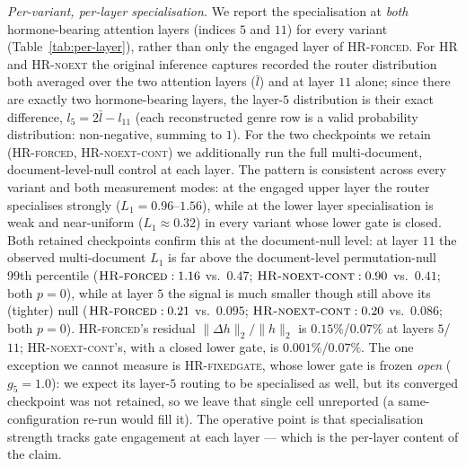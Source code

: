 \emph{Per-variant, per-layer specialisation.} We report the specialisation at \emph{both} hormone-bearing attention layers (indices $5$ and $11$) for every variant (Table~\ref{tab:per-layer}), rather than only the engaged layer of \textsc{HR-forced}. For \textsc{HR} and \textsc{HR-noext} the original inference captures recorded the router distribution both averaged over the two attention layers ($\bar l$) and at layer $11$ alone; since there are exactly two hormone-bearing layers, the layer-$5$ distribution is their exact difference, $l_5 = 2\bar l - l_{11}$ (each reconstructed genre row is a valid probability distribution: non-negative, summing to $1$). For the two checkpoints we retain (\textsc{HR-forced}, \textsc{HR-noext-cont}) we additionally run the full multi-document, document-level-null control at each layer. The pattern is consistent across every variant and both measurement modes: at the engaged upper layer the router specialises strongly ($L_1 = 0.96$--$1.56$), while at the lower layer specialisation is weak and near-uniform ($L_1 \approx 0.32$) in every variant whose lower gate is closed. Both retained checkpoints confirm this at the document-null level: at layer $11$ the observed multi-document $L_1$ is far above the document-level permutation-null 99th percentile ($\textsc{HR-forced}: 1.16$ vs.\ $0.47$; $\textsc{HR-noext-cont}: 0.90$ vs.\ $0.41$; both $p = 0$), while at layer $5$ the signal is much smaller though still above its (tighter) null ($\textsc{HR-forced}: 0.21$ vs.\ $0.095$; $\textsc{HR-noext-cont}: 0.20$ vs.\ $0.086$; both $p = 0$). \textsc{HR-forced}'s residual $\|\Delta h\|_2/\|h\|_2$ is $0.15\%$/$0.07\%$ at layers $5$/$11$; \textsc{HR-noext-cont}'s, with a closed lower gate, is $0.001\%$/$0.07\%$. The one exception we cannot measure is \textsc{HR-fixedgate}, whose lower gate is frozen \emph{open} ($g_5 = 1.0$): we expect its layer-$5$ routing to be specialised as well, but its converged checkpoint was not retained, so we leave that single cell unreported (a same-configuration re-run would fill it). The operative point is that specialisation strength tracks gate engagement at each layer --- which is the per-layer content of the claim.

